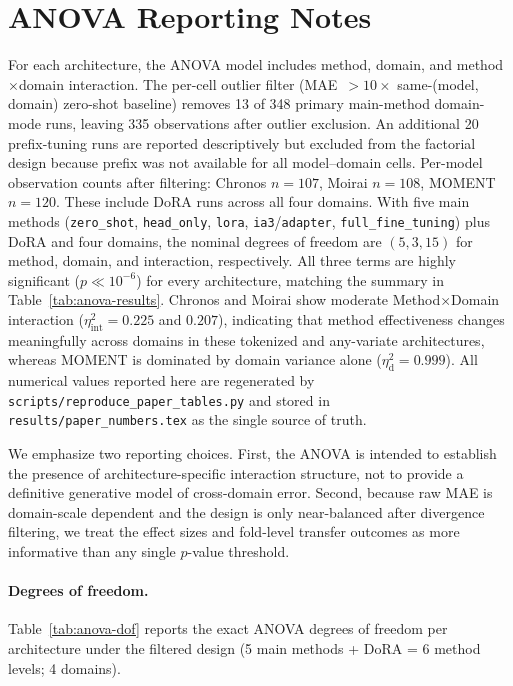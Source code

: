 \section{ANOVA Reporting Notes}
\label{sec:anova-detail}
For each architecture, the ANOVA model includes method, domain, and method$\times$domain interaction. The per-cell outlier filter (MAE~${>}10\times$ same-(model, domain) zero-shot baseline) removes 13 of 348 primary main-method domain-mode runs, leaving 335 observations after outlier exclusion. An additional 20 prefix-tuning runs are reported descriptively but excluded from the factorial design because prefix was not available for all model--domain cells. Per-model observation counts after filtering: Chronos $n{=}107$, Moirai $n{=}108$, MOMENT $n{=}120$. These include DoRA runs across all four domains. With five main methods (\texttt{zero\_shot}, \texttt{head\_only}, \texttt{lora}, \texttt{ia3}/\texttt{adapter}, \texttt{full\_fine\_tuning}) plus DoRA and four domains, the nominal degrees of freedom are $(5, 3, 15)$ for method, domain, and interaction, respectively. All three terms are highly significant ($p \ll 10^{-6}$) for every architecture, matching the summary in Table~\ref{tab:anova-results}. Chronos and Moirai show moderate Method$\times$Domain interaction ($\eta^2_{\text{int}} = 0.225$ and $0.207$), indicating that method effectiveness changes meaningfully across domains in these tokenized and any-variate architectures, whereas MOMENT is dominated by domain variance alone ($\eta^2_{\text{d}} = 0.999$). All numerical values reported here are regenerated by \texttt{scripts/reproduce\_paper\_tables.py} and stored in \texttt{results/paper\_numbers.tex} as the single source of truth.

We emphasize two reporting choices. First, the ANOVA is intended to establish the presence of architecture-specific interaction structure, not to provide a definitive generative model of cross-domain error. Second, because raw MAE is domain-scale dependent and the design is only near-balanced after divergence filtering, we treat the effect sizes and fold-level transfer outcomes as more informative than any single $p$-value threshold.

\paragraph{Degrees of freedom.} Table~\ref{tab:anova-dof} reports the exact ANOVA degrees of freedom per architecture under the filtered design (5 main methods + DoRA = 6 method levels; 4 domains).

